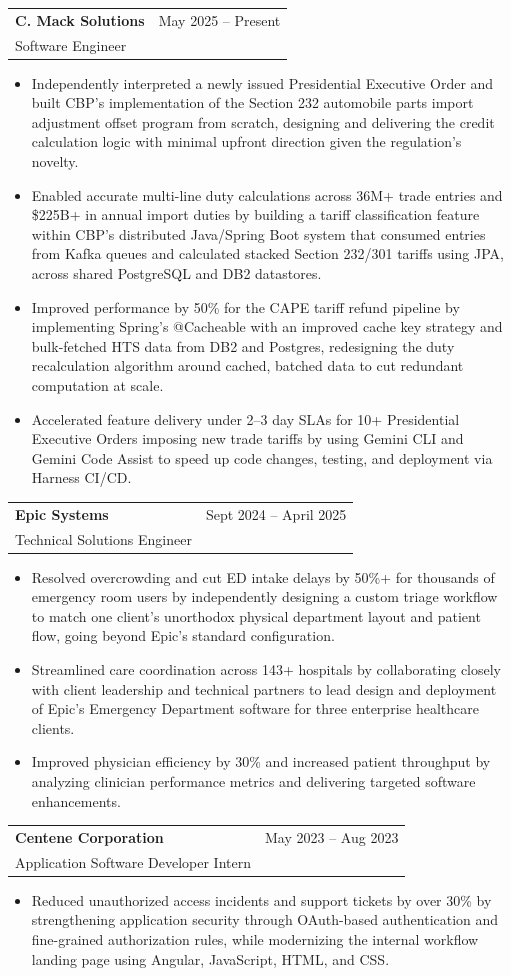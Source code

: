 \documentclass[letterpaper,11pt]{article}
\makeatletter
\newcommand{\resumeItem}[1]{
  \item\small{
    {#1}
  }
}
\newcommand{\resumeSubheading}[4]{
  \vspace{-1pt}\item
    \begin{tabular*}{0.97\textwidth}[t]{l@{\extracolsep{\fill}}r}
      \textbf{#1} & #2 \\
      #3 & \textit{\small #4} \\
    \end{tabular*}\vspace{-5pt}
}
\newcommand{\resumeItemListStart}{\begin{itemize}[itemsep=-1pt]}
\newcommand{\resumeItemListEnd}{\end{itemize}\vspace{-4pt}}
\makeatother
\begin{document}
    \resumeSubheading
      {C. Mack Solutions}{May 2025 -- Present}
      {Software Engineer}{}
      \resumeItemListStart
        \resumeItem{Independently interpreted a newly issued Presidential Executive Order and built CBP's implementation of the Section 232 automobile parts import adjustment offset program from scratch, designing and delivering the credit calculation logic with minimal upfront direction given the regulation's novelty.}
        \resumeItem{Enabled accurate multi-line duty calculations across 36M+ trade entries and \$225B+ in annual import duties by building a tariff classification feature within CBP's distributed Java/Spring Boot system that consumed entries from Kafka queues and calculated stacked Section 232/301 tariffs using JPA, across shared PostgreSQL and DB2 datastores.}
        \resumeItem{Improved performance by 50\% for the CAPE tariff refund pipeline by implementing Spring's @Cacheable with an improved cache key strategy and bulk-fetched HTS data from DB2 and Postgres, redesigning the duty recalculation algorithm around cached, batched data to cut redundant computation at scale.}
        \resumeItem{Accelerated feature delivery under 2--3 day SLAs for 10+ Presidential Executive Orders imposing new trade tariffs by using Gemini CLI and Gemini Code Assist to speed up code changes, testing, and deployment via Harness CI/CD.}
      \resumeItemListEnd

    \resumeSubheading
      {Epic Systems}{Sept 2024 -- April 2025}
      {Technical Solutions Engineer}{}
      \resumeItemListStart
        \resumeItem{Resolved overcrowding and cut ED intake delays by 50\%+ for thousands of emergency room users by independently designing a custom triage workflow to match one client's unorthodox physical department layout and patient flow, going beyond Epic's standard configuration.}
        \resumeItem{Streamlined care coordination across 143+ hospitals by collaborating closely with client leadership and technical partners to lead design and deployment of Epic's Emergency Department software for three enterprise healthcare clients.}
        \resumeItem{Improved physician efficiency by 30\% and increased patient throughput by analyzing clinician performance metrics and delivering targeted software enhancements.}
      \resumeItemListEnd

    \resumeSubheading
      {Centene Corporation}{May 2023 -- Aug 2023}
      {Application Software Developer Intern}{}
      \resumeItemListStart
        \resumeItem{Reduced unauthorized access incidents and support tickets by over 30\% by strengthening application security through OAuth-based authentication and fine-grained authorization rules, while modernizing the internal workflow landing page using Angular, JavaScript, HTML, and CSS.}
      \resumeItemListEnd
\end{document}
